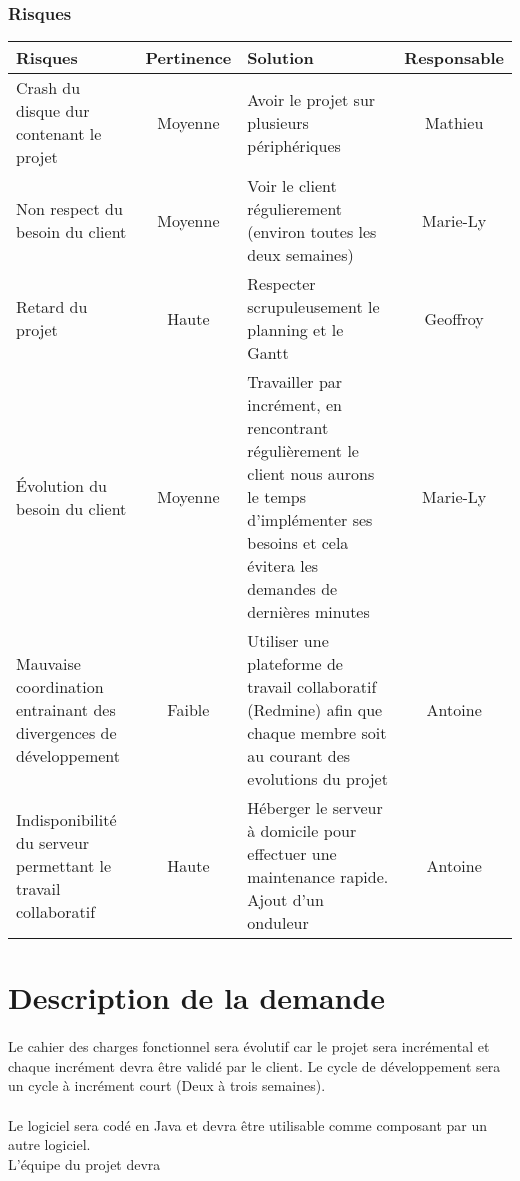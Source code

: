 \documentclass[12pt,a4paper,openany]{article}
\begin{document}
		\subsubsection{Risques}
		\begin{center}
		\begin{tabular}{|p{5.5cm}|c|p{6.5cm}|c|}
				\hline
				\textbf{Risques} & \textbf{Pertinence} & \textbf{Solution} & \textbf{Responsable} \\
				\hline
				Crash du disque dur contenant le projet & Moyenne & Avoir le projet sur plusieurs périphériques & Mathieu\\
				\hline
				Non respect du besoin du client & Moyenne & Voir le client régulierement (environ toutes les deux semaines) & Marie-Ly\\ 
				\hline
				Retard du projet & Haute & Respecter scrupuleusement le planning et le Gantt & Geoffroy\\
				\hline
				Évolution du besoin du client & Moyenne &  Travailler par incrément, en rencontrant régulièrement le client  nous aurons le temps d'implémenter
				ses besoins et cela évitera les demandes de dernières minutes & Marie-Ly \\ 
				\hline
				Mauvaise coordination entrainant des divergences de développement& Faible & Utiliser une plateforme de travail collaboratif (Redmine) afin que
				chaque membre soit au courant des evolutions du projet & Antoine \\
				\hline
				Indisponibilité du serveur permettant le travail collaboratif & Haute& Héberger le serveur à domicile pour effectuer une maintenance rapide.
				Ajout d'un onduleur & Antoine  \\
				\hline
			\end{tabular}
		\end{center}	
	\section{Description de la demande}
	\paragraph{}
		Le cahier des charges fonctionnel sera évolutif car le projet sera incrémental et chaque incrément devra 
		être validé par le client. Le cycle de développement sera un cycle à incrément court (Deux à trois semaines).
	\paragraph{}
		Le logiciel sera codé en Java et devra être utilisable comme composant par un autre logiciel.\\
		L'équipe du projet devra 
\end{document}
